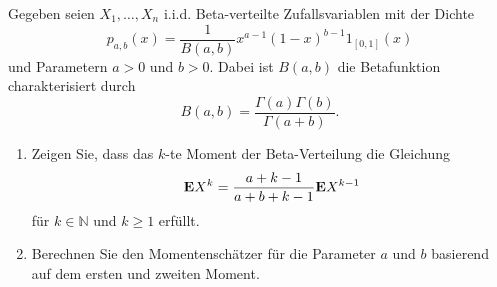  Gegeben seien $X_1, \ldots, X_n$ i.i.d. Beta-verteilte
Zufallsvariablen mit der Dichte
\begin{equation*}
    p_{a,b}(x) = \frac{1}{B(a,b)} x^{a-1} (1-x)^{b-1} 1_{ \left[ 0,1 \right]  } (x)
\end{equation*}
und Parametern $a>0$ und $b>0$. Dabei ist $B(a,b)$ die Betafunktion charakterisiert durch
\begin{equation*}
    B(a,b) = \frac{\Gamma(a)\Gamma(b)}{\Gamma(a+b)}.
\end{equation*}
\begin{enumerate}
    \item Zeigen Sie, dass das $k$-te Moment der Beta-Verteilung die Gleichung
        \begin{equation*}
            \mathbf{E} X^{k} = \frac{a+k-1}{a+b+k-1} \mathbf{E} X^{k-1}
        \end{equation*}
        für $k\in \mathbb N$ und $k\geq 1$ erfüllt. 
    \item Berechnen Sie den Momentenschätzer für die Parameter $a$ und $b$ basierend auf dem ersten und zweiten Moment.
\end{enumerate}

